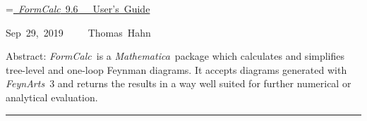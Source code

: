 \documentclass[twoside,11pt]{article}
\def\FA{\textit{FeynArts}}
\def\FC{\textit{FormCalc}}
\def\mma{\textit{Mathematica}}
\begin{document}
\thispagestyle{empty}

\vspace*{.7\textheight}

\newbox\titlebox\setbox\titlebox=\hbox{\underline{%
\vrule width 0pt height 0pt depth 2ex%
\Huge \FC~9.6~~~User's Guide}}

\hfill\copy\titlebox

\vspace*{1ex}

\hfill\hbox{Sep 29, 2019~~~~~Thomas Hahn}

\bigskip
\bigskip

\hfill\parbox{\wd\titlebox}{%
\begin{small}
Abstract:
\FC\ is a \mma\ package which calculates and simplifies tree-level and
one-loop Feynman diagrams.  It accepts diagrams generated with \FA\ 3
and returns the results in a way well suited for further numerical or
analytical evaluation.
\end{small}}

\clearpage

\vspace*{.5\textheight}
\vfill

\hrule

\medskip
\end{document}
